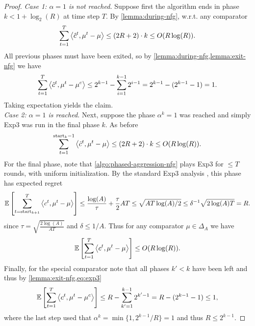 \begin{proof}
    \emph{Case 1: $\alpha=1$ is not reached.} Suppose first the algorithm ends in phase $k <1+\log_2(R)$ at time step $T$. By \cref{lemma:during-nfg}, w.r.t. any comparator 
    \begin{align*}
        \sum_{t=1}^T \left\langle \hat{c}^t, \mu^t-\mu \right\rangle \leq (2R+2) \cdot k \leq O(R \log(R)).
    \end{align*}
    All previous phases must have been exited, so by \cref{lemma:during-nfg,lemma:exit-nfg} we have 
    \begin{align*}
        \sum_{t=1}^T \left\langle \hat{c}^t, \mu^t-\mu^c \right\rangle \leq 2^{k-1} - \sum_{i=1}^{k-1} 2^{i-1} = 2^{k-1} - (2^{k-1}-1) = 1.
    \end{align*}
    Taking expectation yields the claim.\\

    \emph{Case 2: $\alpha=1$ is reached.} Next, suppose the phase $\alpha^k=1$ was reached and simply Exp3 was run in the final phase $k$. As before
    \begin{align*}
        \sum_{t=1}^{\text{start}_{k}-1} \left\langle \hat{c}^t, \mu^t-\mu \right\rangle \leq (2R+2) \cdot k \leq O(R \log(R)).
    \end{align*}
    For the final phase, note that \cref{algo:phased-aggression-nfg} plays Exp3 for $\leq T$ rounds, with uniform initialization. By the standard Exp3 analysis \citep[Sec. 10.1]{orabona2019modern}, this phase has expected regret
    \begin{align}
        \mathbb{E}\left[ \sum_{t=\text{start}_{k+1}}^T \left\langle c^t, \mu^t-\mu \right\rangle \right] \leq \frac{\log(A)}{\tau} + \frac{\tau}{2} AT 
        \leq \sqrt{AT\log(A)/2}
        \leq \delta^{-1}\sqrt{2\log(A) T}=R . \label{eq:exp3}
    \end{align}
    since $\tau=\sqrt{\frac{2\log(A)}{AT}}$ and $\delta\leq 1/A$. Thus for any comparator $\mu\in\Delta_A$ we have
    \begin{align*}
        \mathbb{E}\left[ \sum_{t=1}^T \left\langle c^t, \mu^t - \mu \right\rangle \right] \leq O(R\log(R)).
    \end{align*}
    Finally, for the special comparator note that all phases $k'<k$ have been left and thus by \cref{lemma:exit-nfg,eq:exp3} 
    \begin{align*}
        \mathbb{E}\left[ \sum_{t=1}^T \left\langle c^t, \mu^t - \mu^c \right\rangle \right] \leq R - \sum_{k'=1}^{k-1} 2^{k'-1}= R - (2^{k-1} -1 ) \leq 1,
    \end{align*}
    where the last step used that $\alpha^k=\min\{1,2^{k-1}/R\}=1$ and thus $R\leq2^{k-1}$.
\end{proof}

